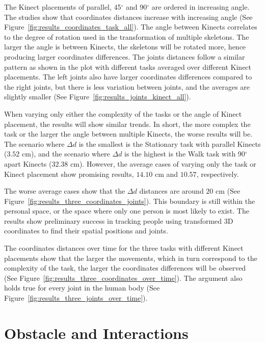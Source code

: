 The Kinect placements of parallel, 45$^{\circ}$ and 90$^{\circ}$ are ordered in increasing angle. The studies show that coordinates distances increase with increasing angle (See Figure~\ref{fig:results_coordinates_task_all}). The angle between Kinects correlates to the degree of rotation used in the transformation of multiple skeletons. The larger the angle is between Kinects, the skeletons will be rotated more, hence producing larger coordinates differences. The joints distances follow a similar pattern as shown in the plot with different tasks averaged over different Kinect placements. The left joints also have larger coordinates differences compared to the right joints, but there is less variation between joints, and the averages are slightly smaller (See Figure~\ref{fig:results_joints_kinect_all}).

When varying only either the complexity of the tasks or the angle of Kinect placement, the results will show similar trends. In short, the more complex the task or the larger the angle between multiple Kinects, the worse results will be. The scenario where $\Delta d$ is the smallest is the Stationary task with parallel Kinects ($3.52$ cm), and the scenario where $\Delta d$ is the highest is the Walk task with 90$^{\circ}$ apart Kinects ($32.38$ cm). However, the average cases of varying only the task or Kinect placement show promising results, $14.10$ cm and $10.57$, respectively.

The worse average cases show that the $\Delta d$ distances are around $20$ cm (See Figure~\ref{fig:results_three_coordinates_joints}). This boundary is still within the personal space, or the space where only one person is most likely to exist. The results show preliminary success in tracking people using transformed 3D coordinates to find their spatial positions and joints.

The coordinates distances over time for the three tasks with different Kinect placements show that the larger the movements, which in turn correspond to the complexity of the task, the larger the coordinates differences will be observed (See Figure~\ref{fig:results_three_coordinates_over_time}). The argument also holds true for every joint in the human body (See Figure~\ref{fig:results_three_joints_over_time}).

\section{Obstacle and Interactions}
\label{sec:discussion_obstacle}

